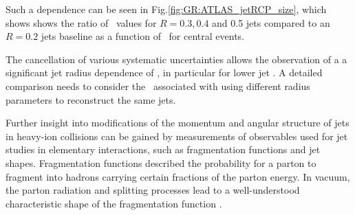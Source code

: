 Such a dependence can be seen in Fig.\ref{fig:GR:ATLAS_jetRCP_size}, which shows 
shows the ratio of \Rcp\ values for $R = 0.3, 0.4$ and 0.5 jets compared
to an $R = 0.2$ jets baseline as a function of \pt\ for central events.

The cancellation of various systematic uncertainties allows the observation of a 
a significant jet radius dependence of \Rcp, in particular for
lower jet \pT. A detailed comparison needs to consider the \pT\ associated with
using different radius parameters to reconstruct the same jets.

Further insight into modifications of the momentum and angular structure
of jets in heavy-ion collisions can be gained by measurements of 
observables used for jet studies in elementary interactions, such as 
fragmentation functions and jet shapes.
Fragmentation functions described the probability for a parton to fragment into
hadrons carrying certain fractions of the parton energy. 
In vacuum, the parton radiation and splitting processes lead to a
well-understood characteristic shape of the fragmentation function \cite{Dokshitzer:1991wu}.

